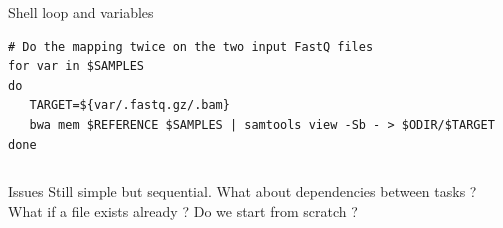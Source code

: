\documentclass{beamer}
\begin{document}
\begin{frame}[fragile]
\begin{columns}
\begin{column}[T]{9cm}
\begin{block}{Shell loop and variables}
\begin{lstlisting}
# Do the mapping twice on the two input FastQ files
for var in $SAMPLES
do
   TARGET=${var/.fastq.gz/.bam}
   bwa mem $REFERENCE $SAMPLES | samtools view -Sb - > $ODIR/$TARGET
done
  \end{lstlisting}                                                      
  \end{block}
 \end{column}
\end{columns}
 
 
 \pause
  \begin{alertblock}{Issues}
  Still simple but sequential. What about dependencies between tasks ? What if a file exists already ? Do we start from scratch ?
  \end{alertblock} 
\end{frame}

\end{document}
